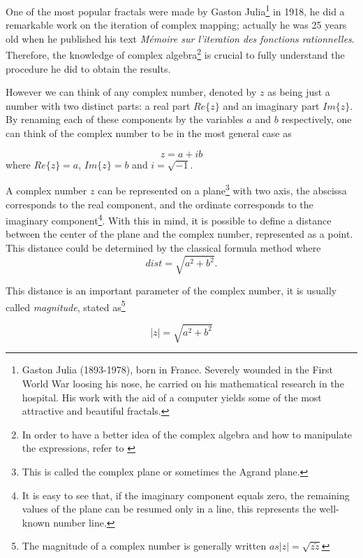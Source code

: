 \documentclass{article}
\begin{document}
One of the most popular fractals were made by Gaston Julia\footnote{Gaston Julia (1893-1978), born in France. Severely wounded in the First World War loosing his nose, he carried on his mathematical research in the hospital. His work with the aid of a computer yields some of the most attractive and beautiful fractals.} in 1918, he did a remarkable work on the iteration of complex mapping; actually he was 25 years old when he published his text \textit{Mémoire  sur  l’iteration  des  fonctions  rationnelles}\cite{PJS}. Therefore, the knowledge of complex algebra\footnote{In order to have a better idea of the complex algebra and how to manipulate the expressions, refer to \cite{wolfram}} is crucial to fully understand the procedure he did to obtain the results.

However we can think of any complex number, denoted by $z$ as being just a number with two distinct parts: a real part $Re\{z\}$ and an imaginary part $Im\{z\}$. By renaming each of these components by the variables $a$ and $b$ respectively, one can think of the complex number to be in the most general case as

\begin{equation}
    z=a+ib
\end{equation} where $Re\{z\} = a$, $Im\{z\} = b$ and $i=\sqrt{-1}$.

 A complex number $z$ can be represented on a plane\footnote{This is called the complex plane or sometimes the Agrand plane.} with two axis, the abscissa corresponds to the real component, and the ordinate corresponds to the imaginary component\footnote{It is easy to see that, if the imaginary component equals zero, the remaining values of the plane can be resumed only in a line, this represents the well-known number line.}. With this in mind, it is possible to define a distance between the center of the plane and the complex number, represented as a point. This distance could be determined by the classical formula method where
\begin{equation}
    dist = \sqrt{a^2 + b^2}.
\end{equation}

This distance is an important parameter of the complex number, it is usually called \textit{magnitude}, stated as\footnote{The magnitude of a complex number is generally written $as |z| =\sqrt{z\tilde{z}} $} 

\begin{equation}
    |z| = \sqrt{a^2 + b^2}
\end{equation}
\end{document}
